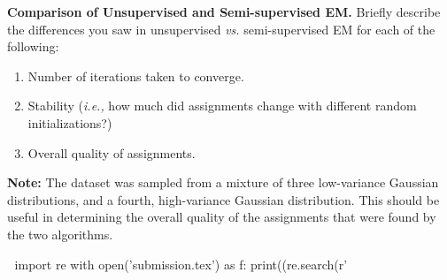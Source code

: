 \item{} \textbf{Comparison of Unsupervised and Semi-supervised EM.}
Briefly describe the differences you saw in unsupervised \emph{vs.} semi-supervised EM for each of the following:
\begin{enumerate}[label=\roman*.]
    \item Number of iterations taken to converge.
    \item Stability (\emph{i.e.,} how much did assignments change with different random initializations?)
    \item Overall quality of assignments.
\end{enumerate}

\textbf{Note:} The dataset was sampled from a mixture of three low-variance Gaussian distributions, and a fourth, high-variance Gaussian distribution. This should be useful in determining the overall quality of the assignments that were found by the two algorithms.

🐍
import re
with open('submission.tex') as f: print((re.search(r'%
🐍
